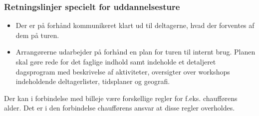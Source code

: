 \subsubsection{Retningslinjer specielt for uddannelsesture}
\begin{itemize}\addtolength{\itemsep}{-0.5\baselineskip}
\item Der er på forhånd kommunikeret klart ud til deltagerne, hvad der forventes af dem på turen.
\item Arrangørerne udarbejder på forhånd en plan for turen til internt brug. Planen skal gøre rede for det faglige
indhold samt indeholde et detaljeret dagsprogram med beskrivelse af aktiviteter, oversigter over workshops
indeholdende deltagerlister, tidsplaner og geografi.
\end{itemize}
Der kan i forbindelse med billeje være forskellige regler for f.eks. chaufførens alder. Det er i den forbindelse
chaufførens ansvar at disse regler overholdes.